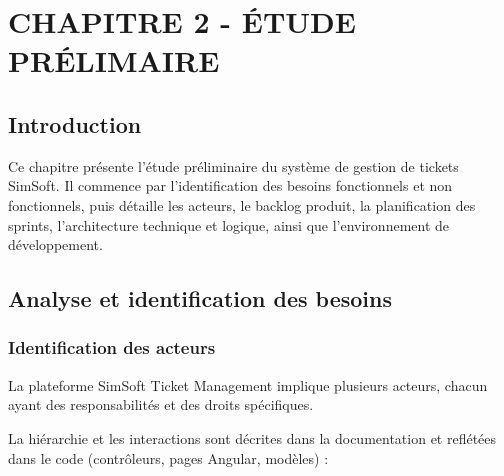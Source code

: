 \newpage
\section{CHAPITRE 2 - ÉTUDE PRÉLIMAIRE}
\label{chap:etude-preliminaire}

\subsection{Introduction}
\label{sec:introduction}
Ce chapitre présente l'étude préliminaire du système de gestion de tickets SimSoft. Il commence par l'identification des besoins fonctionnels et non fonctionnels, puis détaille les acteurs, le backlog produit, la planification des sprints, l'architecture technique et logique, ainsi que l'environnement de développement.


\subsection{Analyse et identification des besoins}
\subsubsection{Identification des acteurs}
\label{sec:identification-des-acteurs}
La plateforme SimSoft Ticket Management implique plusieurs acteurs, chacun ayant des responsabilités et des droits spécifiques.

La hiérarchie et les interactions sont décrites dans la documentation et reflétées dans le code (contrôleurs, pages Angular, modèles) :

